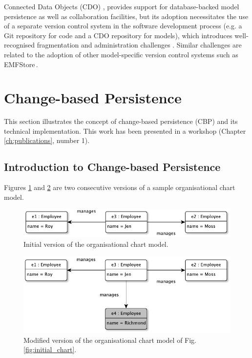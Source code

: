 \documentclass[12pt, a4paper]{report} \usepackage[titletoc]{appendix}
\begin{document}
Connected Data Objects (CDO) \cite{eclipse2017cdo}, provides support for database-backed model persistence as well as collaboration facilities, but its adoption necessitates the use of a separate version control system in the software development process (e.g. a Git repository for code and a CDO repository for models), which introduces well-recognised fragmentation and administration challenges \cite{barmpis2014evaluation}. Similar challenges are related to the adoption of other model-specific version control systems such as EMFStore\,\cite{koegel2010emfstore}.

\section{Change-based Persistence}
\label{sec:change-based_persistence}
This section illustrates the concept of change-based persistence (CBP) and its technical implementation. This work has been presented in a workshop (Chapter \ref{ch:publications}, number 1). 

\subsection{Introduction to Change-based Persistence}
\label{subsec:introduction_to_change-based_persistence}
Figures \ref{fig:initial_chart_0} and \ref{fig:modified_chart} are two consecutive versions of a sample organisational chart model. 

\begin{figure}[ht]
	\centering
	\includegraphics[width=\linewidth]{initial_chart_0}
	\caption{Initial version of the organisational chart model.}
	\label{fig:initial_chart_0}
\end{figure}

\begin{figure}[ht]
	\centering
	\includegraphics[width=\linewidth]{modified_chart}
	\caption{Modified version of the organisational chart model of Fig. \ref{fig:initial_chart}.}
	\label{fig:modified_chart}
\end{figure}
\end{document}
